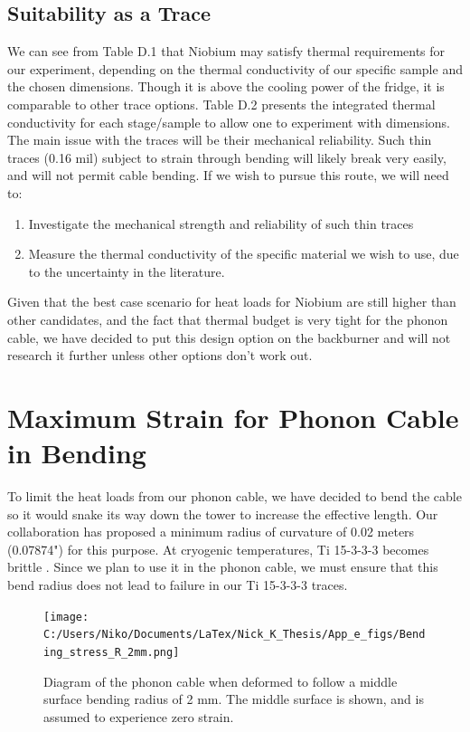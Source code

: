 \documentclass{report}
\begin{document}
\begin{appendices}
\section{Suitability as a Trace}
We can see from Table D.1 that Niobium may satisfy thermal requirements for our experiment, depending on the thermal conductivity of our specific sample and the chosen dimensions. Though it is above the cooling power of the fridge, it is comparable to other trace options. Table D.2 presents the integrated thermal conductivity for each stage/sample to allow one to experiment with dimensions. The main issue with the traces will be their mechanical reliability. Such thin traces (0.16 mil) subject to strain through bending will likely break very easily, and will not permit cable bending. If we wish to pursue this route, we will need to:
\begin{enumerate}
\item Investigate the mechanical strength and reliability of such thin traces
\item Measure the thermal conductivity of the specific material we wish to use, due to the uncertainty in the literature.
\end{enumerate}

Given that the best case scenario for heat loads for Niobium are still higher than other candidates, and the fact that thermal budget is very tight for the phonon cable, we have decided to put this design option on the backburner and will not research it further unless other options don't work out.

\chapter{Maximum Strain for Phonon Cable in Bending}
To limit the heat loads from our phonon cable, we have decided to bend the cable so it would snake its way down the tower to increase the effective length. Our collaboration has proposed a minimum radius of curvature of 0.02 meters (0.07874") for this purpose. At cryogenic temperatures, Ti 15-3-3-3 becomes brittle \cite{James2012}. Since we plan to use it in the phonon cable, we must ensure that this bend radius does not lead to failure in our Ti 15-3-3-3 traces.

\begin{figure}[h]
\centering
\texttt{[image: C:/Users/Niko/Documents/LaTex/Nick\_K\_Thesis/App\_e\_figs/Bending\_stress\_R\_2mm.png]}
\caption{Diagram of the phonon cable when deformed to follow a middle surface bending radius of 2 mm. The middle surface is shown, and is assumed to experience zero strain.}
\end{figure}


\end{appendices}
\end{document}
